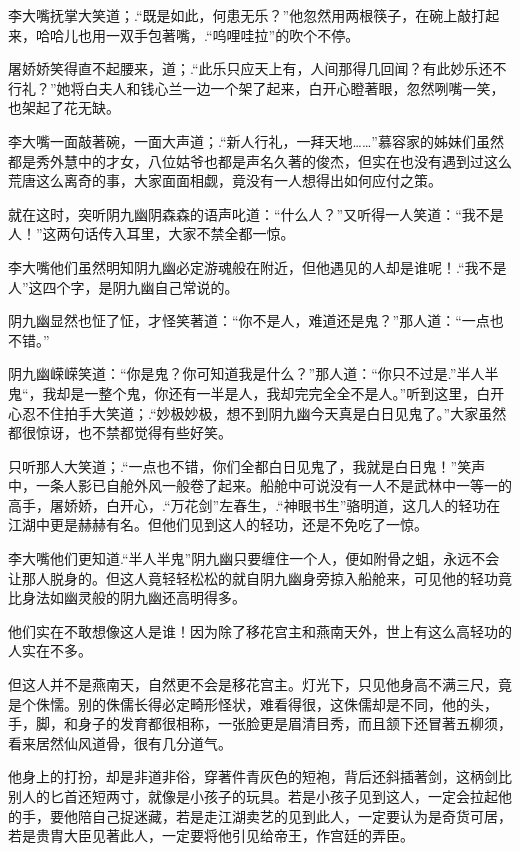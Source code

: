\documentclass[12pt,oneside]{book}
\begin{document}
李大嘴抚掌大笑道；.``既是如此，何患无乐？''他忽然用两根筷子，在碗上敲打起来，哈哈儿也用一双手包著嘴，.``呜哩哇拉''的吹个不停。

屠娇娇笑得直不起腰来，道；.``此乐只应天上有，人间那得几回闻？有此妙乐还不行礼？''她将白夫人和钱心兰一边一个架了起来，白开心瞪著眼，忽然咧嘴一笑，也架起了花无缺。

李大嘴一面敲著碗，一面大声道；.``新人行礼，一拜天地\ldots\ldots{}''慕容家的姊妹们虽然都是秀外慧中的才女，八位姑爷也都是声名久著的俊杰，但实在也没有遇到过这么荒唐这么离奇的事，大家面面相觑，竟没有一人想得出如何应付之策。

就在这时，突听阴九幽阴森森的语声叱道：``什么人？''又听得一人笑道：``我不是人！''这两句话传入耳里，大家不禁全都一惊。

李大嘴他们虽然明知阴九幽必定游魂般在附近，但他遇见的人却是谁呢！.``我不是人''这四个字，是阴九幽自己常说的。

阴九幽显然也怔了怔，才怪笑著道：``你不是人，难道还是鬼？''那人道：``一点也不错。''

阴九幽嵘嵘笑道：``你是鬼？你可知道我是什么？''那人道：``你只不过是.''半人半鬼``，我却是一整个鬼，你还有一半是人，我却完完全全不是人。''听到这里，白开心忍不住拍手大笑道；.``妙极妙极，想不到阴九幽今天真是白日见鬼了。''大家虽然都很惊讶，也不禁都觉得有些好笑。

只听那人大笑道；.``一点也不错，你们全都白日见鬼了，我就是白日鬼！''笑声中，一条人影已自舱外风一般卷了起来。船舱中可说没有一人不是武林中一等一的高手，屠娇娇，白开心，.``万花剑''左春生，.``神眼书生''骆明道，这几人的轻功在江湖中更是赫赫有名。但他们见到这人的轻功，还是不免吃了一惊。

李大嘴他们更知道.``半人半鬼''阴九幽只要缠住一个人，便如附骨之蛆，永远不会让那人脱身的。但这人竟轻轻松松的就自阴九幽身旁掠入船舱来，可见他的轻功竟比身法如幽灵般的阴九幽还高明得多。

他们实在不敢想像这人是谁！因为除了移花宫主和燕南天外，世上有这么高轻功的人实在不多。

但这人并不是燕南天，自然更不会是移花宫主。灯光下，只见他身高不满三尺，竟是个侏懦。别的侏儒长得必定畸形怪状，难看得很，这侏儒却是不同，他的头，手，脚，和身子的发育都很相称，一张脸更是眉清目秀，而且颔下还冒著五柳须，看来居然仙风道骨，很有几分道气。

他身上的打扮，却是非道非俗，穿著件青灰色的短袍，背后还斜插著剑，这柄剑比别人的匕首还短两寸，就像是小孩子的玩具。若是小孩子见到这人，一定会拉起他的手，要他陪自己捉迷藏，若是走江湖卖艺的见到此人，一定要认为是奇货可居，若是贵胄大臣见著此人，一定要将他引见给帝王，作宫廷的弄臣。
\end{document}
